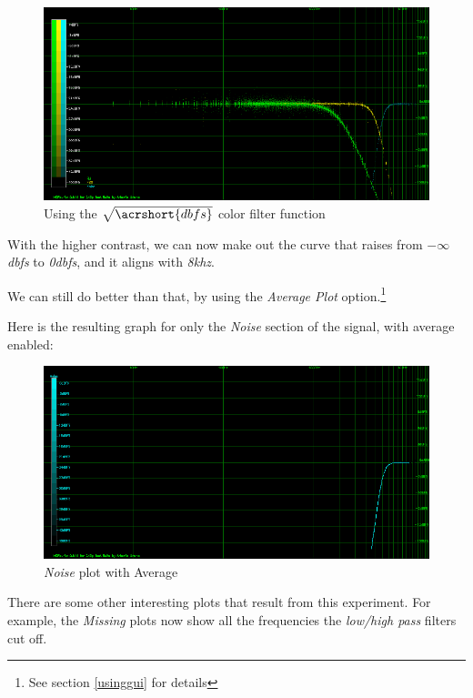 \documentclass[10pt,a4paper]{report}
\newcommand{\fkhz}[1]{\textit{#1\acrshort{khz}}}
\newcommand{\db}[1]{\textit{#1\acrshort{dbfs}}}
\begin{document}
\begin{figure}[H]
	\centering
	\includegraphics[width=1.0\linewidth]{images/interpretation/Plot4-2-All-sqrt.png}
	\caption[Using SQRT]{Using the $\sqrt{\acrshort{dbfs}}$ color filter function}
	\label{fig:plot4-2-all-sqrt}
\end{figure}

With the higher contrast, we can now make out the curve that raises from \db{$-\infty$} to \db{0}, and it aligns with \fkhz{8}.

We can still do better than that, by using the \textit{Average Plot} option.\footnote{See section \ref{usinggui} for details}

Here is the resulting graph for only the \textit{Noise} section of the signal, with average enabled:

\begin{figure}[H]
	\centering
	\includegraphics[width=1.0\linewidth]{images/interpretation/Plot4-3-AVG-Noise.png}
	\caption[Noise Average]{\textit{Noise} plot with Average}
	\label{fig:plot4-3-avg-noise}
\end{figure}

There are some other interesting plots that result from this experiment. For example, the \textit{Missing} plots now show all the frequencies the \textit{low/high pass} filters cut off.
\end{document}
